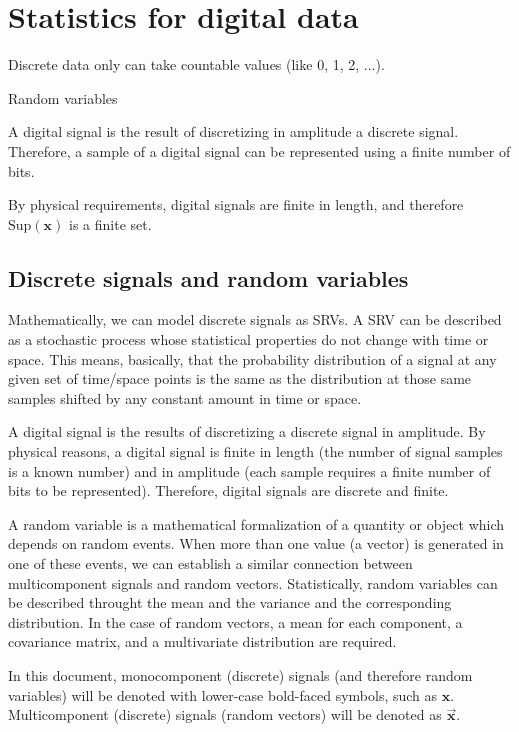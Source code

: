 \chapter{Statistics for digital data}


Discrete data only can take countable values (like 0, 1, 2, ...).

Random variables

A digital signal is the result of discretizing in amplitude a discrete
signal. Therefore, a sample of a digital signal can be represented
using a finite number of bits.

By physical requirements, digital signals are finite in length, and therefore
$\text{Sup}(\mathbf{x})$ is a finite set.

\section{Discrete signals and random variables}

Mathematically, we can model discrete signals as \glspl{SRV}. A
\gls{SRV} can be described as a stochastic process whose statistical
properties do not change with time or space. This means, basically,
that the probability distribution of a signal at any given set of
time/space points is the same as the distribution at those same
samples shifted by any constant amount in time or space.


A digital signal is the results of discretizing a discrete signal in
amplitude. By physical reasons, a digital signal is finite in length
(the number of signal samples is a known number) and in amplitude
(each sample requires a finite number of bits to be
represented). Therefore, digital signals are discrete and finite.

A random variable is a mathematical formalization of a quantity or
object which depends on random events. When more than one value (a
vector) is generated in one of these events, we can establish a
similar connection between multicomponent signals and random
vectors. Statistically, random variables can be described throught the
mean and the variance and the corresponding distribution. In the case
of random vectors, a mean for each component, a covariance matrix, and
a multivariate distribution are required.

In this document, monocomponent (discrete) signals (and therefore
random variables) will be denoted with lower-case bold-faced symbols,
such as $\mathbf{x}$. Multicomponent (discrete) signals (random
vectors) will be denoted as $\overrightarrow{\mathbf{x}}$.

